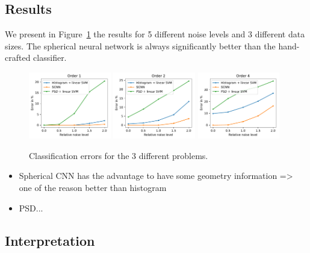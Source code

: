 \documentclass[final,twocolumn,3p,times,authoryear]{elsarticle}
\newcommand{\nati}[1]{{\color[rgb]{.1,.6,.1}{#1}}}
\newcommand{\assign}[1]{{\color[rgb]{.8,.5,.8}{Assigned: #1 }}}
\newcommand{\1}{\b{1}}              %
\newcommand{\0}{\b{0}}              %
\begin{document}
\subsection{Results}
\assign{Nathanaël, Tomek}

We present in Figure~\ref{fig:results} the results for 5 different noise levels and $3$ different data sizes. The spherical neural network is always significantly better than the hand-crafted classifier.

\begin{figure}[!ht]
\centering
\includegraphics[width=0.32\textwidth]{figures/result_order1.pdf}
\includegraphics[width=0.32\textwidth]{figures/result_order2.pdf}
\includegraphics[width=0.32\textwidth]{figures/result_order4.pdf}
\caption{Classification errors for the 3 different problems. \nati{TODO: order is not correct} }
\label{fig:results}
\end{figure}


\begin{itemize}
	\item Spherical CNN has the advantage to have some geometry information => one of the reason better than histogram
	\item PSD...
\end{itemize}

\citep{patton2017cosmologicalconstraints}



\subsection{Interpretation}
\assign{Nathanaël, Tomek, Michaël}
\end{document}
